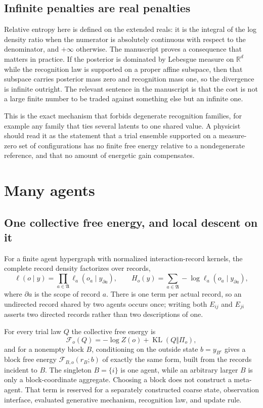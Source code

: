 \documentclass[11pt,letterpaper]{article}
\newcommand{\KL}{\operatorname{KL}}
\begin{document}
\subsection{Infinite penalties are real penalties}

Relative entropy here is defined on the extended reals: it is the integral of the log density ratio when the numerator is absolutely continuous with respect to the denominator, and \(+\infty\) otherwise. The manuscript proves a consequence that matters in practice. If the posterior is dominated by Lebesgue measure on \(\mathbb R^d\) while the recognition law is supported on a proper affine subspace, then that subspace carries posterior mass zero and recognition mass one, so the divergence is infinite outright. The relevant sentence in the manuscript is that the cost is not a large finite number to be traded against something else but an infinite one.

This is the exact mechanism that forbids degenerate recognition families, for example any family that ties several latents to one shared value. A physicist should read it as the statement that a trial ensemble supported on a measure-zero set of configurations has no finite free energy relative to a nondegenerate reference, and that no amount of energetic gain compensates.

\section{Many agents}

\subsection{One collective free energy, and local descent on it}

For a finite agent hypergraph with normalized interaction-record kernels, the complete record density factorizes over records,
\begin{equation}
  \ell(o\mid y)=\prod_{a\in\mathfrak A}\ell_a(o_a\mid y_{\partial a}),
  \qquad
  H_o(y)=\sum_{a\in\mathfrak A}-\log\ell_a(o_a\mid y_{\partial a}),
  \label{eq:record-factorization}
\end{equation}
where \(\partial a\) is the scope of record \(a\). There is one term per actual record, so an undirected record shared by two agents occurs once; writing both \(E_{ij}\) and \(E_{ji}\) asserts two directed records rather than two descriptions of one.

For every trial law \(Q\) the collective free energy is
\begin{equation}
  \mathcal F_o(Q)=-\log Z(o)+\KL(Q\Vert\Pi_o),
  \label{eq:collective-vfe}
\end{equation}
and for a nonempty block \(B\), conditioning on the outside state \(b=y_{B^c}\) gives a block free energy \(\mathcal F_{B,o}(r_B;b)\) of exactly the same form, built from the records incident to \(B\). The singleton \(B=\{i\}\) is one agent, while an arbitrary larger \(B\) is only a block-coordinate aggregate. Choosing a block does not construct a meta-agent. That term is reserved for a separately constructed coarse state, observation interface, evaluated generative mechanism, recognition law, and update rule.
\end{document}
